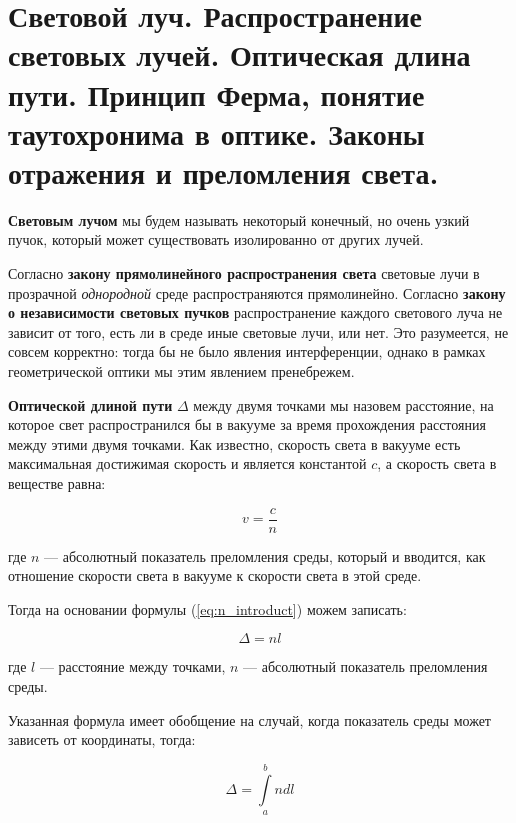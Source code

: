 \section{Световой луч. Распространение световых лучей. Оптическая длина пути. Принцип Ферма, понятие таутохронима в оптике. Законы отражения и преломления света.}

\textbf{Световым лучом} мы будем называть некоторый конечный, но очень узкий пучок, который может существовать изолированно от других лучей.

Согласно \textbf{закону прямолинейного распространения света} световые лучи в прозрачной \textit{однородной} среде распространяются прямолинейно. Согласно \textbf{закону о независимости световых пучков} распространение каждого светового луча не зависит от того, есть ли в среде иные световые лучи, или нет. Это разумеется, не совсем корректно: тогда бы не было явления интерференции, однако в рамках геометрической оптики мы этим явлением пренебрежем.

\textbf{Оптической длиной пути} $\Delta$ между двумя точками мы назовем расстояние, на которое свет распространился бы в вакууме за время прохождения расстояния между этими двумя точками. Как известно, скорость света в вакууме есть максимальная достижимая скорость и является константой $c$, а скорость света в веществе равна:

\begin{equation}
v = \frac{c}{n}
\label{eq:n_introduct}
\end{equation}

где $n$ --- абсолютный показатель преломления среды, который и вводится, как отношение скорости света в вакууме к скорости света в этой среде.

Тогда на основании формулы (\ref{eq:n_introduct}) можем записать:

\begin{equation*}
\Delta = n l
\end{equation*} 

где $l$ --- расстояние между точками, $n$ --- абсолютный показатель преломления среды.

Указанная формула имеет обобщение на случай, когда показатель среды может зависеть от координаты, тогда:

\begin{equation}
\Delta = \int\limits_a^b n dl
\label{eq:delta_introduct}
\end{equation} 


